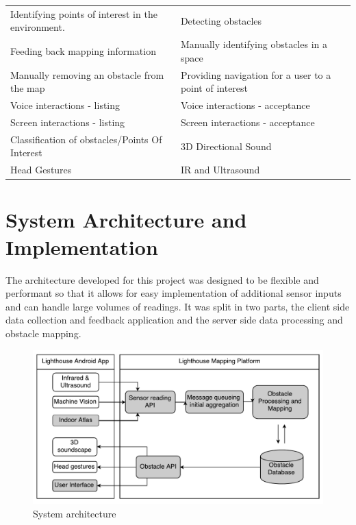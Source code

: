 \documentclass[prodmode,acmtosem]{acmsmall} %
\begin{document}
\begin{center}
\begin{tabularx}{\textwidth}{| X | X |} 
 \hline
 \rowcolor{lightgray}
 \multicolumn{2}{|c|}{List of Requirements} \\ [0.5ex] 
 \hline\hline
 Identifying points of interest in the environment. &  Detecting obstacles \\
 \hline
 Feeding back mapping information &  Manually identifying obstacles in a space \\
 \hline
 Manually removing an obstacle from the map &  Providing navigation for a user to a point of interest \\ 
 \hline
 Voice interactions - listing &  Voice interactions - acceptance \\ 
 \hline
 Screen interactions - listing &  Screen interactions - acceptance \\ 
 \hline
 Classification of obstacles/Points Of Interest &  3D Directional Sound \\ 
 \hline
 Head Gestures &  IR and Ultrasound \\  
 \hline

 \hline
\end{tabularx}
\label{tab:requirements}
\end{center}

\section{System Architecture and Implementation}
\label{sec:architecture}
The architecture developed for this project was designed to be flexible and performant so that it allows for easy implementation of additional sensor inputs and can handle large volumes of readings. It was split in two parts, the client side data collection and feedback application and the server side data processing and obstacle mapping.

\begin{figure}[!ht]
\label{fig:architecture}
\centering
\includegraphics[width=\textwidth]{ReportDiagram.pdf}
\caption{System architecture}
\end{figure}
\end{document}
